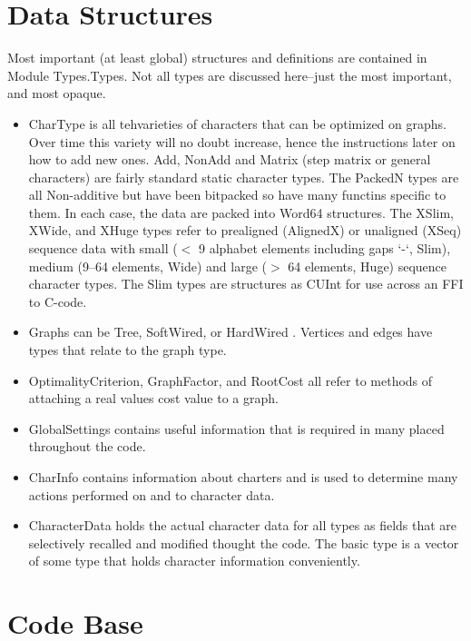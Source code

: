 \documentclass[11pt]{article}
\begin{document}
	\section{Data Structures}
	Most important (at least global) structures and definitions are contained in Module Types.Types.  Not all types are discussed here--just 
	the most important, and most opaque.
	
	\begin{itemize}
		\item {CharType is all tehvarieties of characters that can be optimized on graphs. Over time this variety will no doubt increase,
		hence the instructions later on how to add new ones. Add, NonAdd and Matrix (step matrix or general characters) are fairly standard 
		static character types.  The PackedN types are all Non-additive but have been bitpacked so have many functins specific to them.  In each case,
		the data are packed into Word64 structures. The XSlim, XWide, and XHuge types refer to prealigned (AlignedX) or unaligned (XSeq) sequence
		data with small ($<$ 9 alphabet elements including gaps `-`, Slim), medium (9--64 elements, Wide) and large ($>$ 64 elements, Huge) 
		sequence character types.  The Slim types are structures as CUInt for use across an FFI to C-code.}
	
		\item{Graphs can be Tree, SoftWired, or HardWired \cite{Fischeretal2013}.  Vertices and edges have types that relate to the graph type.}
		
		\item{OptimalityCriterion, GraphFactor, and RootCost all refer to methods of attaching a real values cost value to a graph.}
		
		\item{GlobalSettings contains useful information that is required in many placed throughout the code.}
		
		\item{CharInfo contains information about charters and is used to determine many actions performed on and to character data.}
		
		\item{CharacterData holds the actual character data for all types as fields that are selectively recalled and modified 
			thought the code. The basic type is a vector of some type that holds character information conveniently.}
		
	\end{itemize}
	
	
	\section{Code Base}
	
\end{document}
